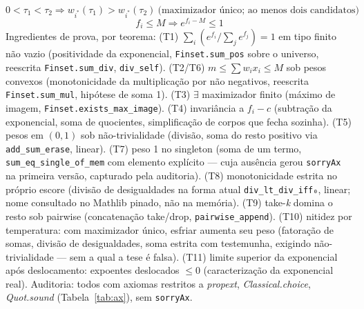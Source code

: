 \documentclass[12pt,openany,oneside,a4paper,brazil,chapter=TITLE]{abntex2}
\begin{document}
\begin{equation*}
0<\tau_1<\tau_2\Rightarrow w_{i^*}(\tau_1)>w_{i^*}(\tau_2)\ \text{(maximizador único; ao menos dois candidatos)} \tag{T10}
\end{equation*}
\begin{equation*}
f_i\leq M\Rightarrow e^{f_i-M}\leq1 \tag{T11}
\end{equation*}
Ingredientes de prova, por teorema: (T1) $\sum_i(e^{f_i}/\sum_j e^{f_j})=1$ em tipo finito não vazio (positividade da exponencial, \texttt{Finset.sum\_pos} sobre o universo, reescrita \texttt{Finset.sum\_div}, \texttt{div\_self}). (T2/T6) $m\leq\sum w_ix_i\leq M$ sob pesos convexos (monotonicidade da multiplicação por não negativos, reescrita \texttt{Finset.sum\_mul}, hipótese de soma 1). (T3) $\exists$ maximizador finito (máximo de imagem, \nolinkurl{Finset.exists_max_image}). (T4) invariância a $f_i-c$ (subtração da exponencial, soma de quocientes, simplificação de corpos que fecha sozinha). (T5) pesos em $(0,1)$ sob não-trivialidade (divisão, soma do resto positivo via \texttt{add\_sum\_erase}, linear). (T7) peso 1 no singleton (soma de um termo, \texttt{sum\_eq\_single\_of\_mem} com elemento explícito --- cuja ausência gerou \texttt{sorryAx} na primeira versão, capturado pela auditoria). (T8) monotonicidade estrita no próprio escore (divisão de desigualdades na forma atual \texttt{div\_lt\_div\_iff₀}, linear; nome consultado no Mathlib pinado, não na memória). (T9) take-\textit{k} domina o resto sob pairwise (concatenação take/drop, \texttt{pairwise\_append}). (T10) nitidez por temperatura: com maximizador único, esfriar aumenta seu peso (fatoração de somas, divisão de desigualdades, soma estrita com testemunha, exigindo não-trivialidade --- sem a qual a tese é falsa). (T11) limite superior da exponencial após deslocamento: expoentes deslocados $\leq 0$ (caracterização da exponencial real). Auditoria: todos com axiomas restritos a \textit{propext}, \textit{Classical.choice}, \textit{Quot.sound} (Tabela~\ref{tab:ax}), sem \texttt{sorryAx}.
\end{document}
